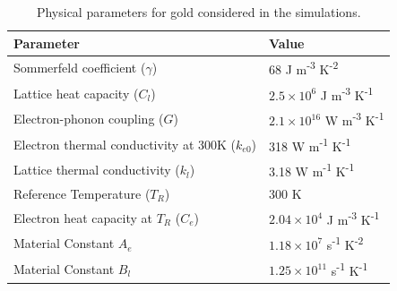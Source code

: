 \begin{table}[H]
    \centering
    \begin{tabular}{|l|l|}
        \hline
        \rowcolor{gray!20}
        \textbf{Parameter}                               & \textbf{Value}                                                     \\
        \hline
        Sommerfeld coefficient ($\gamma$)                & 68 J m\textsuperscript{-3} K\textsuperscript{-2}                   \\
        \hline
        Lattice heat capacity ($C_l$)                    & $2.5 \times 10^6$ J m\textsuperscript{-3} K\textsuperscript{-1}    \\
        \hline
        Electron-phonon coupling ($G$)                   & $2.1 \times 10^{16}$ W m\textsuperscript{-3} K\textsuperscript{-1} \\
        \hline
        Electron thermal conductivity at 300K ($k_{e0}$) & 318 W m\textsuperscript{-1} K\textsuperscript{-1}                  \\
        \hline
        Lattice thermal conductivity ($k_l$)             & 3.18 W m\textsuperscript{-1} K\textsuperscript{-1}                 \\
        \hline
        Reference Temperature ($T_R$)                    & 300 K                                                              \\
        \hline
        Electron heat capacity at $T_R$ ($C_e$)          & $2.04 \times 10^4$ J m\textsuperscript{-3} K\textsuperscript{-1}   \\
        \hline
        Material Constant $A_e$                          & $1.18 \times 10^7$ s\textsuperscript{-1} K\textsuperscript{-2}     \\
        \hline
        Material Constant $B_l$                          & $1.25 \times 10^{11}$ s\textsuperscript{-1} K\textsuperscript{-1}  \\
        \hline
    \end{tabular}
    \caption{Physical parameters for gold considered in the simulations.\cite{Chen_2010}}
    \label{tab:ch2-gold_parameters}
\end{table}


